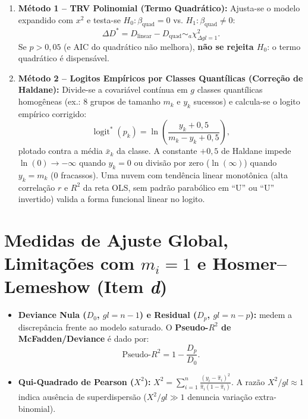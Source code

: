 \documentclass[11pt,a4paper]{article}
\begin{document}
\begin{enumerate}[leftmargin=1.5em]
  \item \textbf{Método 1 -- TRV Polinomial (Termo Quadrático):}
  Ajusta-se o modelo expandido com $x^2$ e testa-se $H_0: \beta_{\text{quad}} = 0$ vs. $H_1: \beta_{\text{quad}} \ne 0$:
  \[
    \Delta D^* = D_{\text{linear}} - D_{\text{quad}} \sim_a \chi^2_{\Delta gl=1}.
  \]
  Se $p > 0{,}05$ (e $\text{AIC}$ do quadrático não melhora), \textbf{não se rejeita $H_0$}: o termo quadrático é dispensável.

  \item \textbf{Método 2 -- Logitos Empíricos por Classes Quantílicas (Correção de Haldane):}
  Divide-se a covariável contínua em $g$ classes quantílicas homogêneas (ex.: 8 grupos de tamanho $m_k$ e $y_k$ sucessos) e calcula-se o logito empírico corrigido:
  \[
    \operatorname{logit}^*(p_k) = \ln\!\left(\frac{y_k + 0{,}5}{m_k - y_k + 0{,}5}\right),
  \]
  plotado contra a média $\bar{x}_k$ da classe. A constante $+0{,}5$ de Haldane impede $\ln(0) \to -\infty$ quando $y_k=0$ ou divisão por zero ($\ln(\infty)$) quando $y_k = m_k$ ($0$ fracassos). Uma nuvem com tendência linear monotônica (alta correlação $r$ e $R^2$ da reta OLS, sem padrão parabólico em ``U'' ou ``U'' invertido) valida a forma funcional linear no logito.
\end{enumerate}

\section{Medidas de Ajuste Global, Limitações com $m_i=1$ e Hosmer--Lemeshow (Item \textit{d})}

\begin{itemize}[leftmargin=1.4em]
  \item \textbf{Deviance Nula ($D_0$, $gl = n-1$) e Residual ($D_p$, $gl = n-p$):} medem a discrepância frente ao modelo saturado. O \textbf{Pseudo-$R^2$ de McFadden/Deviance} é dado por:
  \[
    \text{Pseudo-}R^2 = 1 - \frac{D_p}{D_0}.
  \]
  \item \textbf{Qui-Quadrado de Pearson ($X^2$):} $X^2 = \sum_{i=1}^n \frac{(y_i-\hat{\pi}_i)^2}{\hat{\pi}_i(1-\hat{\pi}_i)}$. A razão $X^2 / gl \approx 1$ indica ausência de superdispersão ($X^2/gl \gg 1$ denuncia variação extra-binomial).
\end{itemize}
\end{document}
